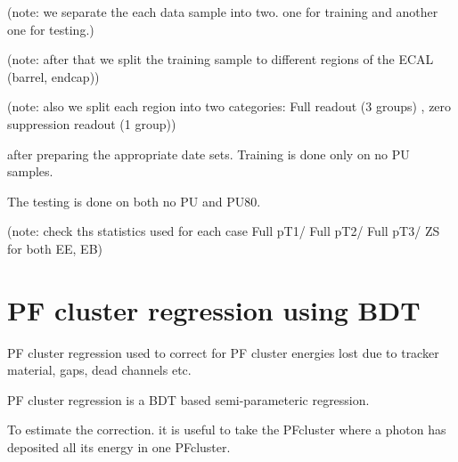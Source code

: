 (note: we separate the each data sample into two. one for training and another one for testing.)

(note: after that we split the training sample to different regions of the ECAL (barrel, endcap))

(note: also we split each region into two categories: Full readout (3 groups) , zero suppression readout (1 group))


after preparing the appropriate date sets. Training is done only on no PU samples.

The testing is done on both no PU and PU80. 

(note: check ths statistics used for each case Full pT1/ Full pT2/ Full pT3/ ZS for both EE, EB)


\section{PF cluster regression using BDT}

PF cluster regression used to correct for PF cluster energies lost due to tracker material, gaps, dead channels etc.

PF cluster regression is a BDT based semi-parameteric regression. 

To estimate the correction. it is useful to take the PFcluster where a photon has deposited all its energy in one PFcluster.

